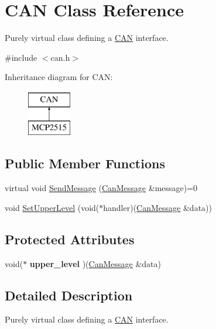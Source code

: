 \hypertarget{class_c_a_n}{}\section{C\+AN Class Reference}
\label{class_c_a_n}


Purely virtual class defining a \hyperlink{class_c_a_n}{C\+AN} interface.  




{\ttfamily \#include $<$can.\+h$>$}

Inheritance diagram for C\+AN\+:\begin{figure}[H]
\begin{center}
\leavevmode
\includegraphics[height=2.000000cm]{class_c_a_n}
\end{center}
\end{figure}
\subsection*{Public Member Functions}
\begin{DoxyCompactItemize}
\item 
virtual void \hyperlink{class_c_a_n_a6d9cf7beee73adaaa0be93426a078612}{Send\+Message} (\hyperlink{struct_can_message}{Can\+Message} \&message)=0
\item 
void \hyperlink{class_c_a_n_ad4e5c357a39aea0a0535e1213c519570}{Set\+Upper\+Level} (void($\ast$handler)(\hyperlink{struct_can_message}{Can\+Message} \&data))
\end{DoxyCompactItemize}
\subsection*{Protected Attributes}
\begin{DoxyCompactItemize}
\item 
\hypertarget{class_c_a_n_afacc93d464447391f9eb5443b6a22190}{}\label{class_c_a_n_afacc93d464447391f9eb5443b6a22190} 
void($\ast$ {\bfseries upper\+\_\+level} )(\hyperlink{struct_can_message}{Can\+Message} \&data)
\end{DoxyCompactItemize}


\subsection{Detailed Description}
Purely virtual class defining a \hyperlink{class_c_a_n}{C\+AN} interface. 

